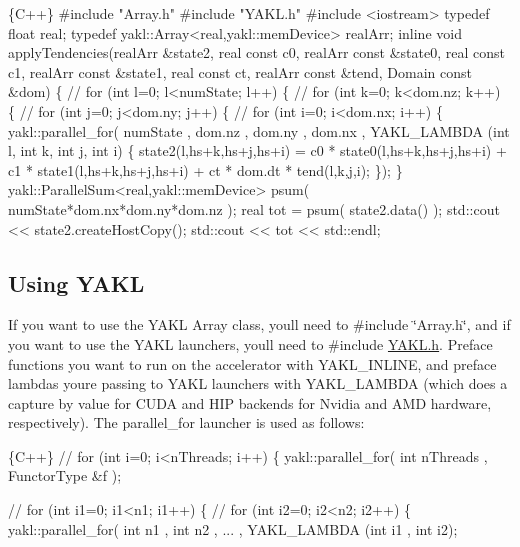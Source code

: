 \begin{DoxyCode}
\{C++\}
#include "Array.h"
#include "YAKL.h"
#include <iostream>
typedef float real;
typedef yakl::Array<real,yakl::memDevice> realArr;
inline void applyTendencies(realArr &state2, real const c0, realArr const &state0,
                                             real const c1, realArr const &state1,
                                             real const ct, realArr const &tend,
                                             Domain const &dom) \{
  // for (int l=0; l<numState; l++) \{
  //   for (int k=0; k<dom.nz; k++) \{
  //     for (int j=0; j<dom.ny; j++) \{
  //       for (int i=0; i<dom.nx; i++) \{
  yakl::parallel\_for( numState , dom.nz , dom.ny , dom.nx , YAKL\_LAMBDA (int l, int k, int j, int i) \{
    state2(l,hs+k,hs+j,hs+i) = c0 * state0(l,hs+k,hs+j,hs+i) +
                               c1 * state1(l,hs+k,hs+j,hs+i) +
                               ct * dom.dt * tend(l,k,j,i);
  \}); 
\}
yakl::ParallelSum<real,yakl::memDevice> psum( numState*dom.nx*dom.ny*dom.nz );
real tot = psum( state2.data() );
std::cout << state2.createHostCopy();
std::cout << tot << std::endl;
\end{DoxyCode}


\subsection*{Using Y\+A\+KL}

If you want to use the Y\+A\+KL Array class, you\textquotesingle{}ll need to {\ttfamily \#include \char`\"{}\+Array.\+h\char`\"{}}, and if you want to use the Y\+A\+KL launchers, you\textquotesingle{}ll need to {\ttfamily \#include \hyperlink{YAKL_8h}{Y\+A\+K\+L.\+h}}. Preface functions you want to run on the accelerator with {\ttfamily Y\+A\+K\+L\+\_\+\+I\+N\+L\+I\+NE}, and preface lambdas you\textquotesingle{}re passing to Y\+A\+KL launchers with {\ttfamily Y\+A\+K\+L\+\_\+\+L\+A\+M\+B\+DA} (which does a capture by value for C\+U\+DA and H\+IP backends for Nvidia and A\+MD hardware, respectively). The {\ttfamily parallel\+\_\+for} launcher is used as follows\+:


\begin{DoxyCode}
\{C++\}
// for (int i=0; i<nThreads; i++) \{
yakl::parallel\_for( int nThreads , FunctorType &f );

// for (int i1=0; i1<n1; i1++) \{
//   for (int i2=0; i2<n2; i2++) \{
yakl::parallel\_for( int n1 , int n2 , ... , YAKL\_LAMBDA (int i1 , int i2);
\end{DoxyCode}


